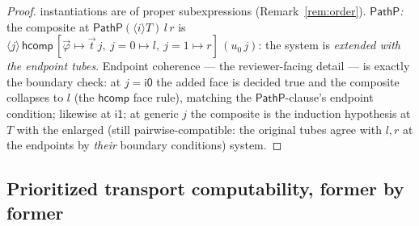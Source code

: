 \documentclass{lmcs}
\newcommand{\hcomp}{\mathsf{hcomp}}
\newcommand{\ii}{\mathsf{i1}}
\newcommand{\io}{\mathsf{i0}}
\begin{document}
\begin{proof}
  instantiations are of proper subexpressions
  (Remark~\ref{rem:order}).
  \emph{$\mathsf{PathP}$:} the composite at
  $\mathsf{PathP}(\langle i \rangle T)\,l\,r$ is
  $\langle j \rangle\, \hcomp\,[\vec\varphi \mapsto \vec t\,j,\
  j{=}0 \mapsto l,\ j{=}1 \mapsto r]\,(u_0\,j)$: the system is
  \emph{extended with the endpoint tubes}.  Endpoint coherence ---
  the reviewer-facing detail --- is exactly the boundary check: at
  $j = \io$ the added face is decided true and the composite
  collapses to $l$ (the $\hcomp$ face rule), matching the
  $\mathsf{PathP}$-clause's endpoint condition; likewise at $\ii$;
  at generic $j$ the composite is the induction hypothesis at $T$
  with the enlarged (still pairwise-compatible: the original tubes
  agree with $l, r$ at the endpoints by \emph{their} boundary
  conditions) system.
\end{proof}

\subsection{Prioritized transport computability, former by former}
\label{app:coretransp}
\end{document}
